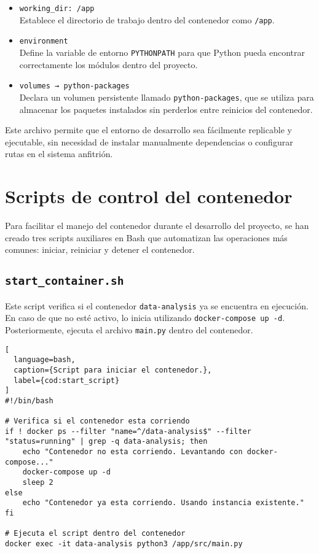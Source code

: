 \begin{itemize}
  \item \texttt{working\_dir: /app}\\
  Establece el directorio de trabajo dentro del contenedor como \texttt{/app}.

  \item \texttt{environment}\\
  Define la variable de entorno \texttt{PYTHONPATH} para que Python pueda encontrar correctamente los módulos dentro del proyecto.
  
  \item \texttt{volumes → python-packages}\\
  Declara un volumen persistente llamado \texttt{python-packages}, que se utiliza para almacenar los paquetes instalados sin perderlos entre reinicios del contenedor.
\end{itemize}

Este archivo permite que el entorno de desarrollo sea fácilmente replicable y ejecutable, sin necesidad de instalar manualmente dependencias o configurar rutas en el sistema anfitrión.
\newpage

\section{Scripts de control del contenedor}

Para facilitar el manejo del contenedor durante el desarrollo del proyecto, se han creado tres scripts auxiliares en Bash que automatizan las operaciones más comunes: iniciar, reiniciar y detener el contenedor.

\subsection{\texttt{start\_container.sh}}

Este script verifica si el contenedor \texttt{data-analysis} ya se encuentra en ejecución. En caso de que no esté activo, lo inicia utilizando \texttt{docker-compose up -d}. Posteriormente, ejecuta el archivo \texttt{main.py} dentro del contenedor.

\begin{lstlisting}[
  language=bash,
  caption={Script para iniciar el contenedor.},
  label={cod:start_script}
]
#!/bin/bash

# Verifica si el contenedor esta corriendo
if ! docker ps --filter "name=^/data-analysis$" --filter "status=running" | grep -q data-analysis; then
    echo "Contenedor no esta corriendo. Levantando con docker-compose..."
    docker-compose up -d
    sleep 2
else
    echo "Contenedor ya esta corriendo. Usando instancia existente."
fi

# Ejecuta el script dentro del contenedor
docker exec -it data-analysis python3 /app/src/main.py
\end{lstlisting}

